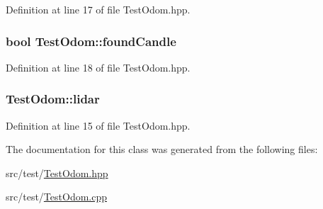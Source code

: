 Definition at line 17 of file Test\-Odom.\-hpp.

\hypertarget{classTestOdom_ac289c026423da6aec36952f02bc39b4f}{
\subsubsection[{found\-Candle}]{\setlength{\rightskip}{0pt plus 5cm}bool Test\-Odom\-::found\-Candle\hspace{0.3cm}{\ttfamily [private]}}}\label{classTestOdom_ac289c026423da6aec36952f02bc39b4f}


Definition at line 18 of file Test\-Odom.\-hpp.

\hypertarget{classTestOdom_a4b17e0e5d2294c284a6bc4c3a496b9dd}{
\subsubsection[{lidar}]{ Test\-Odom\-::lidar\hspace{0.3cm}{\ttfamily [private]}}}\label{classTestOdom_a4b17e0e5d2294c284a6bc4c3a496b9dd}


Definition at line 15 of file Test\-Odom.\-hpp.



The documentation for this class was generated from the following files\-:\begin{DoxyCompactItemize}
\item 
src/test/\hyperlink{TestOdom_8hpp}{Test\-Odom.\-hpp}\item 
src/test/\hyperlink{TestOdom_8cpp}{Test\-Odom.\-cpp}\end{DoxyCompactItemize}
